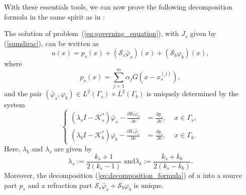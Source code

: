 With these essentials tools, we can now prove the following
decomposition formula in the same spirit as in \cite{kang1996}:
\begin{lemma} \label{lemlatter} The solution of
problem~(\ref{eq:governing_equation}), with $J_s$ given by
(\ref{sumdirac}), can be written as
\begin{equation}
u(x)=p_s(x)+(\mathcal{S}_{s}\tilde{\varphi_{s}})(x)+(\mathcal{S}_{b}\varphi_{b})(x),\label{eq:decomposition_formula}
\end{equation}
 where
\begin{equation}
p_s(x)=\sum_{j=1}^{m}\alpha_{j}G(x-x_s^{(j)}),\label{eq:definition_H}
\end{equation}
 and the pair $(\tilde{\varphi_{s}},\varphi_{b})\in L^{2}(\Gamma_{s})\times L^{2}(\Gamma_{b})$
is uniquely determined by the system
\begin{equation}
\left\{ \begin{alignedat}{2}(\lambda_{s}I-\mathcal{K}_{s}^{*})\tilde{\varphi_{s}}-\frac{\partial\mathcal{S}_{b}\varphi_{b}}{\partial\nu} & =\frac{\partial p_s}{\partial\nu}, & \,\, x\in\Gamma_{s},\\
(\lambda_{b}I - \mathcal{K}_{b}^{*})\varphi_{b} -
\frac{\partial\mathcal{S}_{s}\tilde{\varphi_{s}}}{\partial\nu} & =
\frac{\partial p_s}{\partial\nu}, & \,\, x\in\Gamma_{b}.
\end{alignedat}
\right.\label{eq:definition_phis_phib}
\end{equation}
Here, $\lambda_b$ and $\lambda_s$ are given by
\begin{equation} \label{deflambdas}
\lambda_{s}:=\frac{k_{s}+1}{2(k_{s}-1)}\mbox{ and
}\lambda_{b}:=\frac{k_{s}+k_{b}}{2(k_{s}-k_{b})}.
\end{equation}
Moreover, the decomposition (\ref{eq:decomposition_formula}) of
$u$ into a source part $p_s$ and a refraction part
$\mathcal{S}_{s}\tilde{\varphi_{s}}+\mathcal{S}_{b}\varphi_{b}$ is
unique.\end{lemma}

